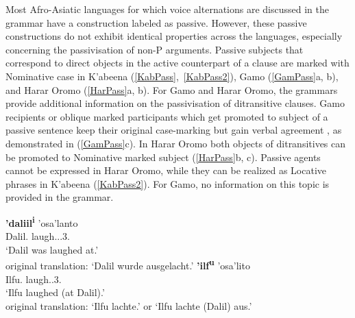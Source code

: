 Most Afro-Asiatic languages for which voice alternations are discussed in the grammar have a construction labeled as passive.
However, these passive constructions do not exhibit identical properties across the languages, especially concerning the passivisation of non-P arguments. 
Passive subjects that correspond to direct objects in the active counterpart of a clause are mark\-ed with Nominative  case in K'abeena (\ref{KabPass},~\ref{KabPass2}), Gamo (\ref{GamPass}a, b), and Harar Oromo (\ref{HarPass}a, b).
For Gamo and Harar Oromo, the grammars provide additional information on the passivisation of ditransitive clauses. 
Gamo recipients or oblique marked participants which get promoted to subject of a passive sentence keep their original case-marking but gain verbal agreement \citep[394]{Hompo:1990}, as demonstrated in (\ref{GamPass}c). 
In Harar Oromo both objects of ditransitives can be promoted to Nominative  marked subject (\ref{HarPass}b, c). 
Passive agents cannot be expressed in Harar Oromo, while they can be realized as Locative phrases in K'abeena (\ref{KabPass2}). 
For Gamo, no information on this topic is provided in the grammar.\enlargethispage{2\baselineskip}


\begin{exe}\ex\label{KabPass}
\begin{xlist}
\ex\gll \textbf{'daliil\textsuperscript{i}} 'osa'lanto\\
Dalil.\nom{} laugh.\pass{}.\pfv{}.3\sg{}.\fem{}\\
\glt `Dalil was laughed at.'\\
original translation: `Dalil wurde ausgelacht.'
\ex\gll \textbf{'ilf\textsuperscript{u}} 'osa'lito\\
Ilfu.\nom{} laugh.\pfv{}.3\sg{}.\fem{}\\
\glt `Ilfu laughed (at Dalil).'\\ 
original translation: `Ilfu lachte.' or `Ilfu lachte (Dalil) aus.'
\end{xlist}
\end{exe}

